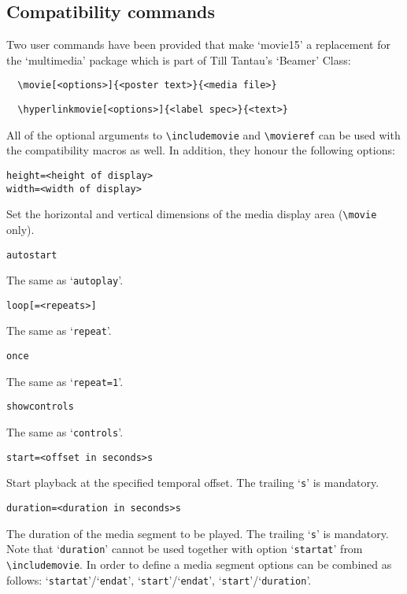 \documentclass[a4paper]{article}
\begin{document}
\subsection{Compatibility commands}
Two user commands have been provided that make `movie15' a replacement for the `multimedia' package which is part of Till Tantau's `Beamer' Class:
\begin{verbatim}
  \movie[<options>]{<poster text>}{<media file>}
\end{verbatim}
\begin{verbatim}
  \hyperlinkmovie[<options>]{<label spec>}{<text>}
\end{verbatim}
All of the optional arguments to \verb+\includemovie+ and \verb+\movieref+ can be used with the compatibility macros as well. In addition, they honour the following options:
\begin{verbatim}
height=<height of display>
width=<width of display>
\end{verbatim}
Set the horizontal and vertical dimensions of the media display area (\verb+\movie+ only).
\begin{verbatim}
autostart
\end{verbatim}
The same as `\verb+autoplay+'.
\begin{verbatim}
loop[=<repeats>]
\end{verbatim}
The same as `\verb+repeat+'.
\begin{verbatim}
once
\end{verbatim}
The same as `\verb+repeat=1+'.
\begin{verbatim}
showcontrols
\end{verbatim}
The same as `\verb+controls+'.
\begin{verbatim}
start=<offset in seconds>s
\end{verbatim}
Start playback at the specified temporal offset. The trailing `\verb+s+' is mandatory.
\begin{verbatim}
duration=<duration in seconds>s
\end{verbatim}
The duration of the media segment to be played. The trailing `\verb+s+' is mandatory. Note that `\verb+duration+' cannot be used together with option `\verb+startat+' from \verb+\includemovie+. In order to define a media segment options can be combined as follows: `\verb+startat+'/`\verb+endat+', `\verb+start+'/`\verb+endat+', `\verb+start+'/`\verb+duration+'.

\end{document}
